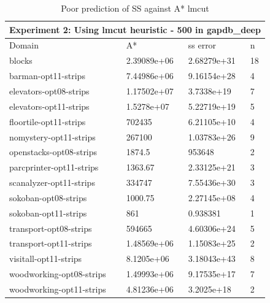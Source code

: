 \documentclass[a4paper,12pt]{article}
\begin{document}
\begin{table}[]
\centering
\caption{Poor prediction of SS against A* lmcut}
\label{my-label}
\begin{tabular}{l|l|l|l}
\hline
\multicolumn{4}{l}{Experiment 2: Using lmcut heuristic - 500 in gapdb\_deep} \\ \hline
Domain& A*& ss error& n \\ \hline

blocks& 2.39089e+06& 2.68279e+31& 18\\ \hline
barman-opt11-strips& 7.44986e+06& 9.16154e+28& 4\\ \hline
elevators-opt08-strips& 1.17502e+07& 3.7338e+19& 7\\ \hline
elevators-opt11-strips& 1.5278e+07& 5.22719e+19& 5\\ \hline
floortile-opt11-strips& 702435& 6.21105e+10& 4\\ \hline
nomystery-opt11-strips& 267100& 1.03783e+26& 9\\ \hline
openstacks-opt08-strips& 1874.5& 953648& 2\\ \hline
parcprinter-opt11-strips& 1363.67& 2.33125e+21& 3\\ \hline
scanalyzer-opt11-strips& 334747& 7.55436e+30& 3\\ \hline
sokoban-opt08-strips& 1000.75& 2.27145e+08& 4\\ \hline
sokoban-opt11-strips& 861& 0.938381& 1\\ \hline
transport-opt08-strips& 594665& 4.60306e+24& 5\\ \hline
transport-opt11-strips& 1.48569e+06& 1.15083e+25& 2\\ \hline
visitall-opt11-strips& 8.1205e+06& 3.18043e+43& 8\\ \hline
woodworking-opt08-strips& 1.49993e+06& 9.17535e+17& 7\\ \hline
woodworking-opt11-strips& 4.81236e+06& 3.2025e+18& 2\\ \hline
\end{tabular}
\end{table}
\end{document}

